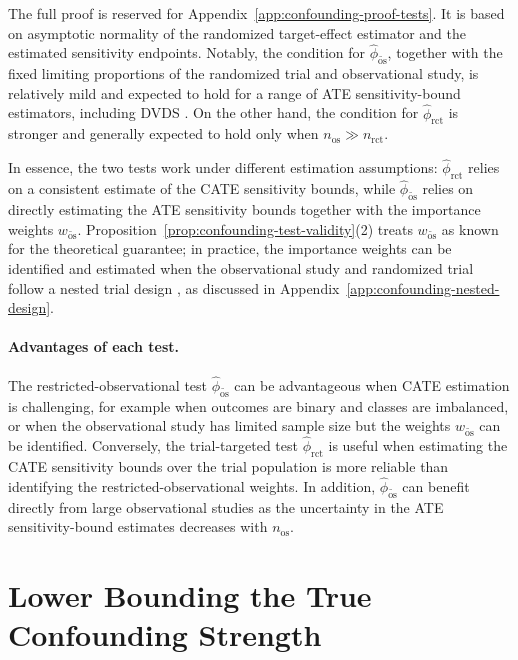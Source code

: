 The full proof is reserved for Appendix~\ref{app:confounding-proof-tests}. It is based on asymptotic normality of the randomized target-effect estimator and the estimated sensitivity endpoints. Notably, the condition for \(\widehat{\phi}_{\widetilde{\mathrm{os}}}\), together with the fixed limiting proportions of the randomized trial and observational study, is relatively mild and expected to hold for a range of ATE sensitivity-bound estimators, including DVDS \citep{dorn2021doubly}. On the other hand, the condition for \(\widehat{\phi}_{\mathrm{rct}}\) is stronger and generally expected to hold only when \(n_{\mathrm{os}}\gg n_{\mathrm{rct}}\).

In essence, the two tests work under different estimation assumptions: \(\widehat{\phi}_{\mathrm{rct}}\) relies on a consistent estimate of the CATE sensitivity bounds, while \(\widehat{\phi}_{\widetilde{\mathrm{os}}}\) relies on directly estimating the ATE sensitivity bounds together with the importance weights \(w_{\widetilde{\mathrm{os}}}\). Proposition~\ref{prop:confounding-test-validity}(2) treats \(w_{\widetilde{\mathrm{os}}}\) as known for the theoretical guarantee; in practice, the importance weights can be identified and estimated when the observational study and randomized trial follow a nested trial design \citep{olschewski1985comprehensive,olschewski1992analysis,choudhry2017randomized}, as discussed in Appendix~\ref{app:confounding-nested-design}.

\paragraph{Advantages of each test.}
The restricted-observational test \(\widehat{\phi}_{\widetilde{\mathrm{os}}}\) can be advantageous when CATE estimation is challenging, for example when outcomes are binary and classes are imbalanced, or when the observational study has limited sample size but the weights \(w_{\widetilde{\mathrm{os}}}\) can be identified. Conversely, the trial-targeted test \(\widehat{\phi}_{\mathrm{rct}}\) is useful when estimating the CATE sensitivity bounds over the trial population is more reliable than identifying the restricted-observational weights. In addition, \(\widehat{\phi}_{\widetilde{\mathrm{os}}}\) can benefit directly from large observational studies as the uncertainty in the ATE sensitivity-bound estimates decreases with \(n_{\mathrm{os}}\).

\section{Lower Bounding the True Confounding Strength}
\label{sec:confounding-lower-bound}


